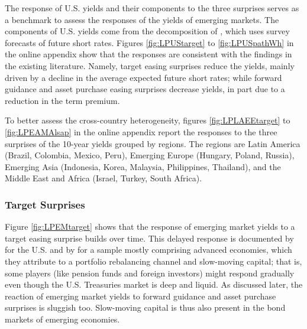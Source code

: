 \documentclass[a4paper, 12pt]{article}
\begin{document}
The response of U.S. yields and their components to the three surprises serves as a benchmark to assess the responses of the yields of emerging markets. The components of U.S. yields come from the decomposition of \cite{KimWright:2005}, which uses survey forecasts of future short rates. Figures \ref{fig:LPUStarget} to \ref{fig:LPUSpathWh} in the online appendix show that the responses are consistent with the findings in the existing literature. Namely, target easing surprises reduce the yields, mainly driven by a decline in the average expected future short rates; while forward guidance and asset purchase easing surprises decrease yields, in part due to a reduction in the term premium. 

To better assess the cross-country heterogeneity, figures \ref{fig:LPLAEEtarget} to \ref{fig:LPEAMAlsap} in the online appendix report the responses to the three surprises of the 10-year yields grouped by regions. The regions are Latin America (Brazil, Colombia, Mexico, Peru), Emerging Europe (Hungary, Poland, Russia), Emerging Asia (Indonesia, Korea, Malaysia, Philippines, Thailand), and the Middle East and Africa (Israel, Turkey, South Africa). 

\subsubsection{Target Surprises}
Figure \ref{fig:LPEMtarget} shows that the response of emerging market yields to a target easing surprise builds over time. This delayed response is documented by \cite{BrooksKatzLustig:2019} for the U.S. and by \cite{ACDM:2019} for a sample mostly comprising advanced economies, which they attribute to a portfolio rebalancing channel and slow-moving capital; that is, some players (like pension funds and foreign investors) might respond gradually even though the U.S. Treasuries market is deep and liquid. As discussed later, the reaction of emerging market yields to forward guidance and asset purchase surprises is sluggish too. Slow-moving capital is thus also present in the bond markets of emerging economies. 
\end{document}

